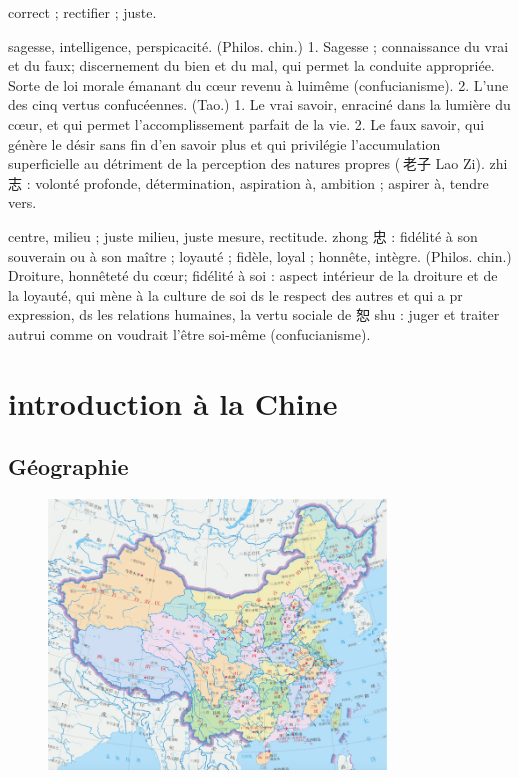 \begin{Def}[zheng 正]
    correct ; rectifier ; juste.  
\end{Def}
\begin{Def}[zhi 智]
    sagesse, intelligence, perspicacité. (Philos. chin.) 1. Sagesse ; connaissance du vrai et du faux; discernement du bien et du mal, qui permet la conduite appropriée. Sorte de loi morale émanant du cœur revenu à luimême (confucianisme). 2. L’une des cinq vertus confucéennes. (Tao.) 1. Le vrai savoir, enraciné dans la lumière du cœur, et qui permet l’accomplissement parfait de la vie. 2. Le faux savoir, qui génère le désir sans fin d’en savoir plus et qui privilégie l’accumulation superficielle au détriment de la perception des natures propres ( 老子 Lao Zi). zhi 志 : volonté profonde, détermination, aspiration à, ambition ; aspirer à, tendre vers.
\end{Def}
\begin{Def}[zhong 中]
    centre, milieu ; juste milieu, juste mesure, rectitude. zhong 忠 : fidélité à son souverain ou à son maître ; loyauté ; fidèle, loyal ; honnête, intègre. (Philos. chin.)     Droiture, honnêteté du cœur; fidélité à soi : aspect intérieur de la droiture et de la loyauté, qui mène à la culture de soi ds le respect des autres et qui a pr expression, ds les relations humaines, la vertu sociale de 恕 shu : juger et traiter autrui comme on voudrait l’être soi-même (confucianisme). 
\end{Def}
 
\section{introduction à la Chine}


\subsection{Géographie}
\begin{figure}[!h]
    \centering
\includegraphics[width=0.8\textwidth]{ConfucianismeTaoismeBouddhismeChinois/Images/CarteChine.png}

    \label{fig:enter-label}
\end{figure}
